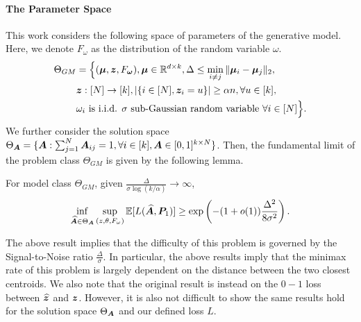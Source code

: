 \paragraph{The Parameter Space} This work considers the following space of parameters of the generative model. Here, we denote $F_{\omega}$ as the distribution of the random variable $\omega$.
\begin{align*}
    \Theta_{GM}&=\Big\{(\boldsymbol{\mu},\boldsymbol{z},F_{\boldsymbol{\omega}}),\boldsymbol{\mu}\in\mathbb{R}^{d\times k}, \Delta\leq \min_{i\neq j}\Vert\boldsymbol{\mu}_i-\boldsymbol{\mu}_j\Vert_2,\\
    &\boldsymbol{z}:[N]\to[k], |\{i\in[N],\boldsymbol{z}_i=u\}|\geq\alpha n, \forall u\in[k], \\
    &\omega_i\text{ is i.i.d. }\sigma\text{ sub-Gaussian random variable } \forall i\in[N]\Big\}.
\end{align*}
We further consider the solution space $\Theta_{\boldsymbol{A}}=\{\boldsymbol{A}:\sum_{j=1}^N\boldsymbol{A}_{ij}=1,\forall i\in[k],\boldsymbol{A}\in[0,1]^{k\times N}\}$.
Then, the fundamental limit of the problem class $\Theta_{GM}$ is given by the following lemma.
\begin{lemma}\label{minimaxlb} For model class $\Theta_{GM}$, given $\frac{\Delta}{\sigma \log(k/\alpha)}\to \infty$, 
\begin{align*}
    \inf_{\widehat{\boldsymbol{A}}\in\Theta_{\boldsymbol{A}}}\sup_{(z,\theta,F_{\omega})}\mathbb{E}[L(\widehat{\boldsymbol{A}},\boldsymbol{P}_1)]\geq\exp\left(-(1+o(1))\frac{\Delta^2}{8\sigma^2} \right).
\end{align*}
\end{lemma}
\begin{remark}
    The above result implies that the difficulty of this problem is governed by the Signal-to-Noise ratio $\frac{\Delta}{\sigma}$. In particular, the above results imply that the minimax rate of this problem is largely dependent on the distance between the two closest centroids.
    We also note that the original result is instead on the $0-1$ loss between $\widehat{\boldsymbol{z}}$ and $\boldsymbol{z}$. However, it is also not difficult to show the same results hold for the solution space $\Theta_{\boldsymbol{A}}$ and our defined loss $L$.
\end{remark}

